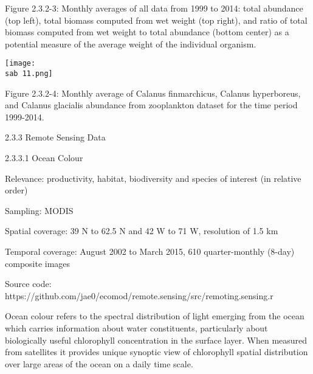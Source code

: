 \documentclass[letterpaper,portrait,12pt]{scrartcl}
\numberwithin{equation}{section}		%
\numberwithin{figure}{section}			%
\numberwithin{table}{section}				%
\newcommand{\sab}{\string~/ecomod_data/mpa/sab/}   %
\begin{document}
Figure 2.3.2-3: Monthly averages of all data from 1999 to 2014: total abundance (top left), total biomass computed from wet weight (top right), and ratio of total biomass computed from wet weight  to total abundance (bottom center) as a potential measure of the average weight of the individual organism.




\texttt{[image: \\sab 11.png]}





Figure 2.3.2-4: Monthly average of Calanus finmarchicus, Calanus hyperboreus, and Calanus glacialis abundance from zooplankton dataset for the time period 1999-2014.














2.3.3  Remote Sensing Data 









2.3.3.1 Ocean Colour









Relevance:  productivity, habitat, biodiversity and species of interest (in relative order)




Sampling:  MODIS




Spatial coverage: \colorbox[rgb]{0.000,1.000,1.000}{39 N to 62.5 N and 42 W to 71 W,} resolution of 1.5 km




Temporal coverage: August 2002 to March 2015, 610 quarter-monthly (8-day) composite  images




Source code: https://github.com/jae0/ecomod/remote.sensing/src/remoting.sensing.r














Ocean colour refers to the spectral distribution of light emerging from the ocean which carries information about water constituents, particularly about biologically useful chlorophyll concentration in the surface layer. When measured from satellites it provides unique synoptic view of chlorophyll spatial distribution over large areas of the ocean on a daily time scale.
\end{document}
